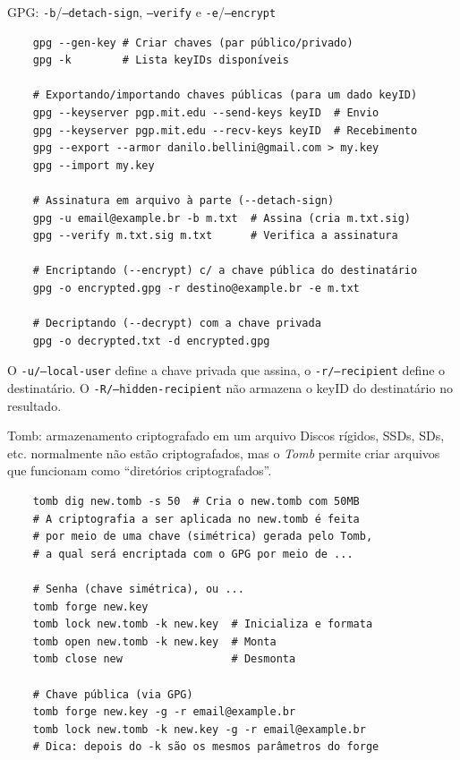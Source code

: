 \documentclass[utf8]{beamer}
\begin{document}
\begin{frame}[fragile]{GPG: \texttt{-b}/\texttt{--detach-sign},
                            \texttt{--verify} e
                            \texttt{-e}/\texttt{--encrypt}}
  \vspace{-1em}
  \begin{verbatim}
    gpg --gen-key # Criar chaves (par público/privado)
    gpg -k        # Lista keyIDs disponíveis

    # Exportando/importando chaves públicas (para um dado keyID)
    gpg --keyserver pgp.mit.edu --send-keys keyID  # Envio
    gpg --keyserver pgp.mit.edu --recv-keys keyID  # Recebimento
    gpg --export --armor danilo.bellini@gmail.com > my.key
    gpg --import my.key

    # Assinatura em arquivo à parte (--detach-sign)
    gpg -u email@example.br -b m.txt  # Assina (cria m.txt.sig)
    gpg --verify m.txt.sig m.txt      # Verifica a assinatura

    # Encriptando (--encrypt) c/ a chave pública do destinatário
    gpg -o encrypted.gpg -r destino@example.br -e m.txt

    # Decriptando (--decrypt) com a chave privada
    gpg -o decrypted.txt -d encrypted.gpg
  \end{verbatim}
  \vfill
  \vspace{-.5em}
  O \texttt{-u/--local-user}
  define a chave privada que assina,
  o \texttt{-r/--recipient} define o destinatário.
  O \texttt{-R/--hidden-recipient}
  não armazena o keyID do destinatário no resultado.
\end{frame}


\begin{frame}[fragile]{Tomb: armazenamento criptografado em um arquivo}
  Discos rígidos, SSDs, SDs, etc.
  normalmente não estão criptografados,
  mas o \emph{Tomb} permite criar arquivos
  que funcionam como ``diretórios criptografados''.
  \vfill
  \begin{verbatim}
    tomb dig new.tomb -s 50  # Cria o new.tomb com 50MB
    # A criptografia a ser aplicada no new.tomb é feita
    # por meio de uma chave (simétrica) gerada pelo Tomb,
    # a qual será encriptada com o GPG por meio de ...

    # Senha (chave simétrica), ou ...
    tomb forge new.key
    tomb lock new.tomb -k new.key  # Inicializa e formata
    tomb open new.tomb -k new.key  # Monta
    tomb close new                 # Desmonta

    # Chave pública (via GPG)
    tomb forge new.key -g -r email@example.br
    tomb lock new.tomb -k new.key -g -r email@example.br
    # Dica: depois do -k são os mesmos parâmetros do forge
  \end{verbatim}
\end{frame}
\end{document}
